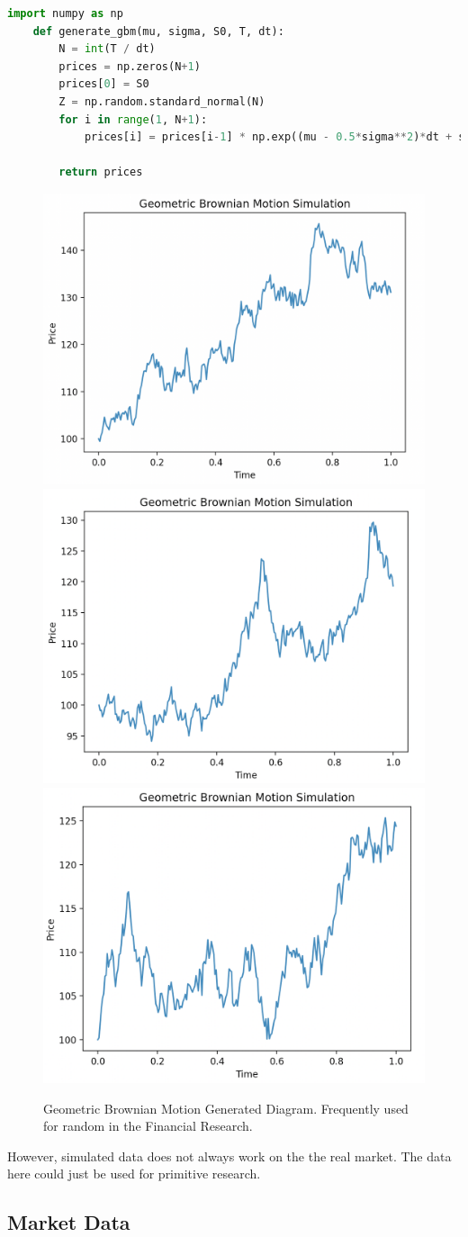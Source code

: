 \documentclass{article}
\begin{document}
\begin{scriptsize}
\begin{lstlisting}[language=Python]
	import numpy as np
	def generate_gbm(mu, sigma, S0, T, dt):
		N = int(T / dt)
		prices = np.zeros(N+1)
		prices[0] = S0
		Z = np.random.standard_normal(N)
		for i in range(1, N+1):
			prices[i] = prices[i-1] * np.exp((mu - 0.5*sigma**2)*dt + sigma*np.sqrt(dt)*Z[i-1])
	
		return prices
\end{lstlisting}
\end{scriptsize}
\begin{figure}
	\includegraphics[width=0.32\linewidth]{GBM1.png}
	\includegraphics[width=0.32\linewidth]{GBM2.png}
	\includegraphics[width=0.32\linewidth]{GBM3.png}
	\caption{Geometric Brownian Motion Generated Diagram. Frequently used for 
	random in the Financial Research. }
\end{figure}
However, simulated data does not always work on the the real market. The data here could 
just be used for primitive research. 
\subsection{Market Data}
\end{document}
